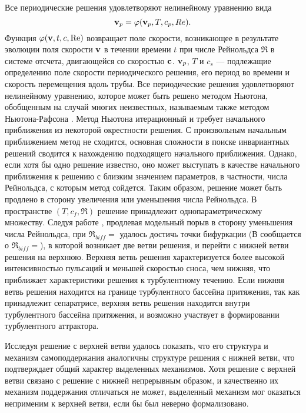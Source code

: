 Все периодические решения удовлетворяют нелинейному уравнению вида
$$
\mathbf{v}_p = \varphi(\mathbf{v}_p, T, c_p, Re).
$$ 
Функция $\varphi(\mathbf{v}, t, c, \operatorname{Re})$ возвращает поле скорости, возникающее в результате эволюции поля скорости $\mathbf{v}$ в течении времени $t$ при числе Рейнольдса $\Re$ в системе отсчета, двигающейся со скоростью $\mathbf{c}$. $\mathbf{v}_p$, $T$ и $c_s$ --- подлежащие определению поле скорости периодического решения, его период во времени и скорость перемещения вдоль трубы.
Все периодические решения удовлетворяют нелинейному уравнению, которое может быть решено методом Ньютона, обобщенным на случай многих неизвестных, называемым также методом Ньютона-Рафсона \cite{}. Метод Ньютона итерационный и требует начального приближения из некоторой окрестности решения. С произвольным начальным приближением метод не сходится, основная сложности в поиске инвариантных решений сводится к нахождению подходящего начального приближения. Однако, если хотя бы одно решение известно, оно может выступать в качестве начального приближения к решению с близким значением параметров, в частности, числа Рейнольдса, с которым метод сойдется. Таким образом, решение может быть продлено в сторону увеличения или уменьшения числа Рейнольдса. В пространстве $(T, c_f, \Re)$ решение принадлежит однопараметрическому множеству. Следуя работе \cite{Avila2013}, продлевая модельный порыв в сторону уменьшения числа Рейнольдса, при $\Re_{biff} = $ удалось достичь точки бифуркации (В \cite{Avila2013} сообщается о $\Re_{biff} = $), в которой возникает две ветви решения, и перейти с нижней ветви решения на верхнюю. Верхняя ветвь решения характеризуется более высокой интенсивностью пульсаций и меньшей скоростью сноса, чем нижняя, что приближает характеристики решения к турбулентному течению. Если нижняя ветвь решения находится на границе турбулентного бассейна притяжения, так как принадлежит сепаратрисе, верхняя ветвь решения находится внутри турбулентного бассейна притяжения, и возможно участвует в формировании турбулентного аттрактора. 

Исследуя решение с верхней ветви удалось показать, что его структура и механизм самоподдержания аналогичны структуре решения с нижней ветви, что подтверждает общий характер выделенных механизмов. Хотя решение с верхней ветви связано с решение с нижней непрерывным образом, и качественно их механизм поддержания отличаться не может, выделенный механизм мог оказаться неприменим к верхней ветви, если бы был неверно формализовано.

